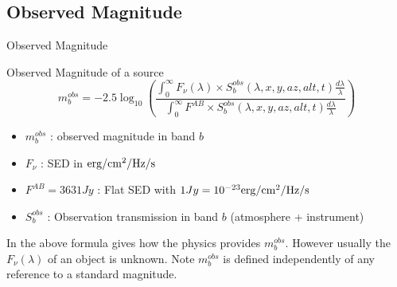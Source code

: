 \documentclass{beamer}
\begin{document}
\subsection{Observed Magnitude}
\begin{frame}{Observed Magnitude}
\begin{alertblock}{Observed Magnitude of a source}
	\begin{equation}
	m^{obs}_b = -2.5 \log_{10}\left( 
	\frac{\int_0^\infty F_\nu(\lambda) \times S_b^{obs}(\lambda,x,y,az,alt,t) \frac{d\lambda}{\lambda} }{\int_0^\infty F^{AB} \times S_b^{obs}(\lambda,x,y,az,alt,t) \frac{d\lambda}{\lambda}} 
	\right)
	\end{equation}
	\begin{itemize}
	\item $m^{obs}_b$ : observed magnitude in band $b$
	\item $F_\nu$ : SED in ${\rm erg/cm^2/Hz/s}$
	\item $F^{AB}=3631 Jy$ : Flat SED with $1 Jy = 10^{-23} {\rm erg/cm^2/Hz/s}$
	\item $S_b^{obs}$ : Observation transmission in band $b$  (atmosphere + instrument)
	\end{itemize}
	\end{alertblock}	
In the above formula gives how the physics provides $m_b^{obs}$. However usually the $F_\nu(\lambda)$ of an object is unknown.	
Note $m^{obs}_b$ is defined independently of any reference to a standard magnitude.
\end{frame}
\end{document}

